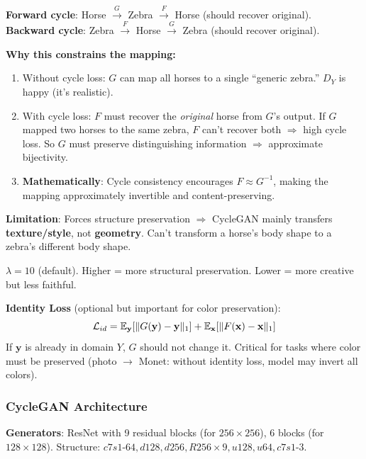 \begin{keybox}
\textbf{Forward cycle}: Horse $\xrightarrow{G}$ Zebra $\xrightarrow{F}$ Horse (should recover original).\\
\textbf{Backward cycle}: Zebra $\xrightarrow{F}$ Horse $\xrightarrow{G}$ Zebra (should recover original).

\textbf{Why this constrains the mapping:}
\begin{enumerate}
\item Without cycle loss: $G$ can map all horses to a single ``generic zebra.'' $D_Y$ is happy (it's realistic).
\item With cycle loss: $F$ must recover the \emph{original} horse from $G$'s output. If $G$ mapped two horses to the same zebra, $F$ can't recover both $\Rightarrow$ high cycle loss. So $G$ must preserve distinguishing information $\Rightarrow$ approximate bijectivity.
\item \textbf{Mathematically}: Cycle consistency encourages $F \approx G^{-1}$, making the mapping approximately invertible and content-preserving.
\end{enumerate}

\textbf{Limitation}: Forces structure preservation $\Rightarrow$ CycleGAN mainly transfers \textbf{texture/style}, not \textbf{geometry}. Can't transform a horse's body shape to a zebra's different body shape.

$\lambda = 10$ (default). Higher = more structural preservation. Lower = more creative but less faithful.
\end{keybox}

\textbf{Identity Loss} (optional but important for color preservation):
\begin{equation}
\mathcal{L}_{id} = \mathbb{E}_{\mathbf{y}}[\|G(\mathbf{y})-\mathbf{y}\|_1] + \mathbb{E}_{\mathbf{x}}[\|F(\mathbf{x})-\mathbf{x}\|_1]
\end{equation}
If $\mathbf{y}$ is already in domain $Y$, $G$ should not change it. Critical for tasks where color must be preserved (photo $\to$ Monet: without identity loss, model may invert all colors).

\subsubsection{CycleGAN Architecture}
\textbf{Generators}: ResNet with 9 residual blocks (for $256{\times}256$), 6 blocks (for $128{\times}128$). Structure: $c7s1$-$64, d128, d256, R256 \times 9, u128, u64, c7s1$-$3$.

